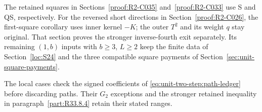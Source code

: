 The retained squares in Sections~\ref{proof:R2-C035}
and~\ref{proof:R2-C033} use S and QS, respectively.
For the reversed short directions in Section~\ref{proof:R2-C026},
the first-square corollary uses inner kernel $-K$; the outer
$T^2$ and its weight $q$ stay original. That section proves the
stronger inverse-fourth exit separately. Its remaining
$(1,b)$ inputs with $b\ge3$, $L\ge2$ keep the finite data of
Section~\ref{loc:S24} and the three compatible square payments of
Section~\ref{sec:unit-square-payments}.

The local cases check the signed coefficients of
\eqref{eq:unit-two-step:path-ledger} before discarding paths.
Their $G_2$ exceptions and the stronger retained inequality in
paragraph~\ref{part:R33.8.4} retain their stated ranges.
